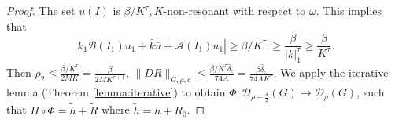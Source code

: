 \begin{proof}
The set $u(I)$ is $\beta/K^\tau, K$-non-resonant with respect to $\omega$. This implies that
\begin{equation}\label{eq:nonres}
|k_1\mathcal{B}(I_1)u_1 + \bar{k}\bar{u} + \mathcal{A}(I_1)u_1| \geq \beta/K^\tau. \geq \frac{\beta}{|k|_1^\tau} \geq \frac{\beta}{K^\tau}.
\end{equation}
Then $\rho_2\leq \frac{\beta/K^\tau}{2MK} = \frac{\beta}{2MK^{\tau+1}}$, $\|DR\|_{G,\rho,c} \leq \frac{\beta/K^\tau \hat{\delta}_c}{74A} = \frac{\beta \hat{\delta}_c}{74AK^\tau}$.
We apply the iterative lemma (Theorem \ref{lemma:iterative}) to obtain $\Phi:\mathcal{D}_{\rho-\frac{\delta}{2}}(G) \rightarrow \mathcal{D}_\rho(G)$, such that $H\circ \Phi = \tilde{h} + \tilde{R}$ where $\tilde{h} = h + R_0$.


\end{proof}
